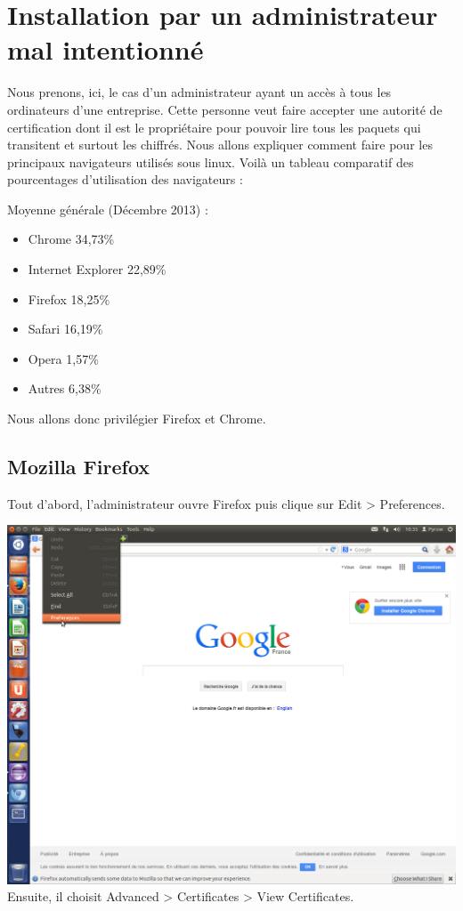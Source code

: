 \documentclass[a4paper,11pt,french]{article}
\begin{document}
\section{Installation par un administrateur mal intentionné}
Nous prenons, ici, le cas d'un administrateur ayant un accès à tous les ordinateurs d'une entreprise.
Cette personne veut faire accepter une autorité de certification dont il est le propriétaire pour pouvoir lire tous les paquets qui transitent et surtout les chiffrés.
Nous allons expliquer comment faire pour les principaux navigateurs utilisés sous linux.
Voilà un tableau comparatif des pourcentages d'utilisation des navigateurs : 

Moyenne générale (Décembre 2013) :
\begin{itemize}
\item{Chrome} 		34,73\%
\item{Internet Explorer}		 22,89\%
\item{Firefox} 		18,25\%
\item{Safari} 		16,19\%
\item{Opera}	 		1,57\%	
\item{Autres} 		6,38\%
\end{itemize}	

Nous allons donc privilégier Firefox et Chrome.
\newpage
\subsection{Mozilla Firefox}

Tout d'abord, l'administrateur ouvre Firefox puis clique sur Edit > Preferences.

\includegraphics[width=\textwidth]{images/OngletPref.png}
\newpage
Ensuite, il choisit Advanced > Certificates > View Certificates.
\end{document}
